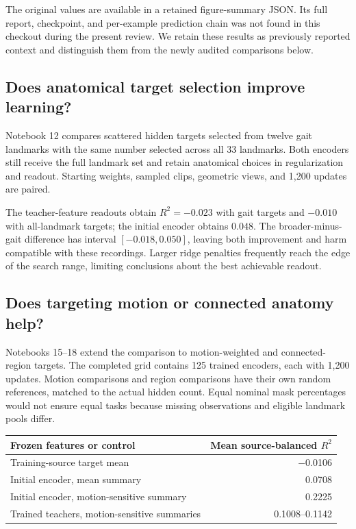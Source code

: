 \documentclass{article}
\begin{document}
The original values are available in a retained figure-summary JSON. Its full report, checkpoint, and per-example prediction chain was not found in this checkout during the present review. We retain these results as previously reported context and distinguish them from the newly audited comparisons below.

\subsection{Does anatomical target selection improve learning?}\label{does-anatomical-target-selection-improve-learning}

Notebook 12 compares scattered hidden targets selected from twelve gait landmarks with the same number selected across all 33 landmarks. Both encoders still receive the full landmark set and retain anatomical choices in regularization and readout. Starting weights, sampled clips, geometric views, and 1,200 updates are paired.

The teacher-feature readouts obtain \(R^2=-0.023\) with gait targets and \(-0.010\) with all-landmark targets; the initial encoder obtains \(0.048\). The broader-minus-gait difference has interval \([-0.018,0.050]\), leaving both improvement and harm compatible with these recordings. Larger ridge penalties frequently reach the edge of the search range, limiting conclusions about the best achievable readout.

\subsection{Does targeting motion or connected anatomy help?}\label{does-targeting-motion-or-connected-anatomy-help}

Notebooks 15--18 extend the comparison to motion-weighted and connected-region targets. The completed grid contains 125 trained encoders, each with 1,200 updates. Motion comparisons and region comparisons have their own random references, matched to the actual hidden count. Equal nominal mask percentages would not ensure equal tasks because missing observations and eligible landmark pools differ.

\begin{table}[htbp]
\centering
\small
\begin{tabular}{@{}lr@{}}
\toprule\noalign{}
Frozen features or control & Mean source-balanced \(R^2\) \\
\midrule\noalign{}

Training-source target mean & −0.0106 \\
Initial encoder, mean summary & 0.0708 \\
Initial encoder, motion-sensitive summary & 0.2225 \\
Trained teachers, motion-sensitive summaries & 0.1008--0.1142 \\
\bottomrule
\end{tabular}
\end{table}
\end{document}
